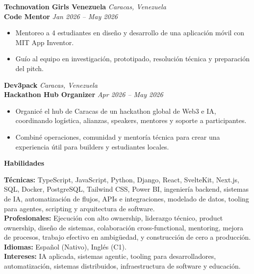 \documentclass[11pt]{article}
\begin{document}
\textbf{Technovation Girls Venezuela} \hfill \textit{Caracas, Venezuela} \\
\textbf{Code Mentor} \hfill \textit{Jan 2026 -- May 2026}
\begin{itemize}
    \item Mentoreo a 4 estudiantes en diseño y desarrollo de una aplicación móvil con MIT App Inventor.
    \item Guío al equipo en investigación, prototipado, resolución técnica y preparación del pitch.
\end{itemize}
\vspace{10pt}
\textbf{Dev3pack} \hfill \textit{Caracas, Venezuela} \\
\textbf{Hackathon Hub Organizer} \hfill \textit{Apr 2026 -- May 2026}
\begin{itemize}
    \item Organicé el hub de Caracas de un hackathon global de Web3 e IA, coordinando logística, alianzas, speakers, mentores y soporte a participantes.
    \item Combiné operaciones, comunidad y mentoría técnica para crear una experiencia útil para builders y estudiantes locales.
\end{itemize}
\vspace{8pt}
\begin{center}
    \textbf{Habilidades}
\end{center}
\vspace{-4pt}
\textbf{Técnicas:} TypeScript, JavaScript, Python, Django, React, SvelteKit, Next.js, SQL, Docker, PostgreSQL, Tailwind CSS, Power BI, ingeniería backend, sistemas de IA, automatización de flujos, APIs e integraciones, modelado de datos, tooling para agentes, scripting y arquitectura de software.
\\[4pt]
\textbf{Profesionales:} Ejecución con alto ownership, liderazgo técnico, product ownership, diseño de sistemas, colaboración cross-functional, mentoring, mejora de procesos, trabajo efectivo en ambigüedad, y construcción de cero a producción. \\[4pt]
\textbf{Idiomas:} Español (Nativo), Inglés (C1). \\[4pt]
\textbf{Intereses:} IA aplicada, sistemas agentic, tooling para desarrolladores, automatización, sistemas distribuidos, infraestructura de software y educación.
\end{document}
